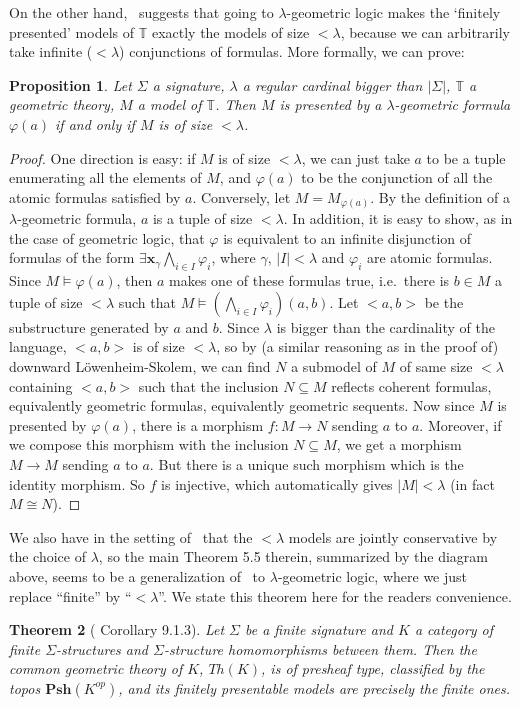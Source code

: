 \documentclass{article}
\newtheorem{theorem}{Theorem}
\newtheorem{proposition}[theorem]{Proposition}
\newcommand{\T}{\mathbb{T}}
\newcommand{\Psh}{\mathbf{Psh}}
\renewcommand{\phi}{\varphi}
\newcommand{\bigAND}{\bigwedge}
\begin{document}
\noindent On the other hand,~\cite[Theorem 5.5]{espindola2023every} suggests that going to $\lambda$-geometric logic makes the `finitely presented' models of $\T$ exactly the models of size $<\lambda$, because we can arbitrarily take infinite ($<\lambda$) conjunctions of formulas. More formally, we can prove: 
\begin{proposition}\label{prop:lambdapres}
    Let $\Sigma$ a signature, $\lambda$ a regular cardinal bigger than $|\Sigma|$, $\T$ a geometric theory, $M$ a model of $\T$. Then $M$ is presented by a $\lambda$-geometric formula $\phi(a)$ if and only if $M$ is of size $<\lambda$.
\end{proposition}
\begin{proof}
    One direction is easy: if $M$ is of size $<\lambda$, we can just take $a$ to be a tuple enumerating all the elements of $M$, and $\phi(a)$ to be the conjunction of all the atomic formulas satisfied by $a$. Conversely, let $M=M_{\phi(a)}$. By the definition of a $\lambda$-geometric formula, $a$ is a tuple of size $<\lambda$. In addition, it is easy to show, as in the case of geometric logic, that $\phi$ is equivalent to an infinite disjunction of formulas of the form $\exists\mathbf{x}_\gamma \bigAND_{i\in I}\phi_i$, where $\gamma,\,|I|<\lambda$ and $\phi_i$ are atomic formulas. Since $M\models \phi(a)$, then $a$ makes one of these formulas true, i.e.~there is $b\in M$ a tuple of size $<\lambda$ such that $M\models (\bigAND_{i\in I}\phi_i)(a,b)$. Let $<a,b>$ be the substructure generated by $a$ and $b$. Since $\lambda$ is bigger than the cardinality of the language, $<a,b>$ is of size $<\lambda$, so by (a similar reasoning as in the proof of) downward Löwenheim-Skolem, we can find $N$ a submodel of $M$ of same size $<\lambda$ containing $<a,b>$ such that the inclusion $N\subseteq M$ reflects coherent formulas, equivalently geometric formulas, equivalently geometric sequents. Now since $M$ is presented by $\phi(a)$, there is a morphism $f:M\xrightarrow{}N$ sending $a$ to $a$. Moreover, if we compose this morphism with the inclusion $N\subseteq M$, we get a morphism $M\xrightarrow{}M$ sending $a$ to $a$. But there is a unique such morphism which is the identity morphism. So $f$ is injective, which automatically gives $|M|<\lambda$ (in fact $M\cong N$).
\end{proof}

\noindent We also have in the setting of~\cite{espindola2023every} that the $<\lambda$ models are jointly conservative by the choice of $\lambda$, so the main Theorem 5.5 therein, summarized by the diagram above, seems to be a generalization of~\cite[Corollary 9.1.3]{caramello2018theories} to $\lambda$-geometric logic, where we just replace ``finite'' by ``$<\lambda$''. We state this theorem here for the readers convenience. 
\begin{theorem}[\cite{caramello2018theories} Corollary 9.1.3]
    Let $\Sigma$ be a finite signature and $K$ a category of finite $\Sigma$-structures
and $\Sigma$-structure homomorphisms between them. Then the common geometric theory
of $K$, $Th(K)$, is of presheaf type, classified by the topos $\Psh(K^{op})$, and its
finitely presentable models are precisely the finite ones.
\end{theorem}
\end{document}
